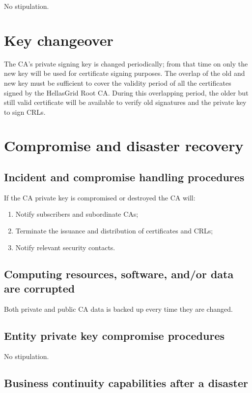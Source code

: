 \documentclass[11pt,a4paper,titlepage]{book}
\begin{document}
No stipulation.

\section{Key changeover}

The CA's private signing key is changed periodically; from that time on only the new key will be used for certificate signing purposes. The overlap of the old and new key must be sufficient to cover the validity period of all the certificates signed by the HellasGrid Root CA. During this overlapping period, the older but still valid certificate will be available to verify old signatures and the private key to sign CRLs.


\section{Compromise and disaster recovery}
\subsection{Incident and compromise handling procedures}

If the CA private key is compromised or destroyed the CA will:

\begin{enumerate}
\item{Notify subscribers and subordinate CAs;}
\item{Terminate the issuance and distribution of certificates and CRLs;}
\item{Notify relevant security contacts.}
\end{enumerate}

\subsection{Computing resources, software, and/or data are corrupted}

Both private and public CA data is backed up every time they are changed.

\subsection{Entity private key compromise procedures}

No stipulation.

\subsection{Business continuity capabilities after a disaster}
\end{document}
